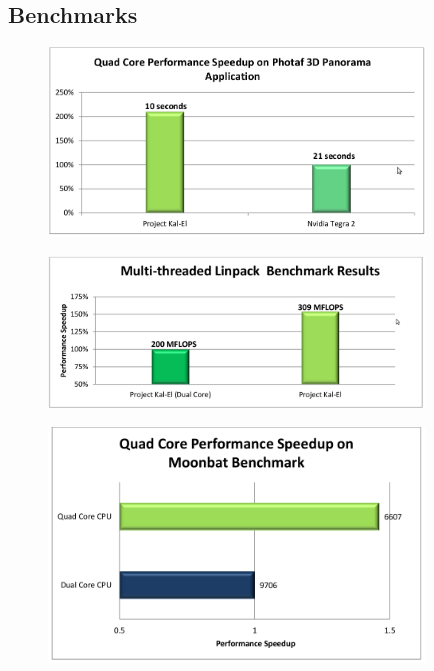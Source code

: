 \documentclass{beamer}
\begin{document}
\subsection{Benchmarks}  
\begin{frame}
  \begin{figure}[ht]
    \centering
    \includegraphics[width=10.0cm]{./pictures/QuadCorePhota.png}
   \end{figure}
\end{frame}

\begin{frame}
  \begin{figure}[ht]
    \centering
    \includegraphics[width=10.0cm]{./pictures/MultiThread.png}
  \end{figure}
\end{frame}

\begin{frame}
  \begin{figure}[ht]
    \centering
    \includegraphics[width=10.0cm]{./pictures/QuadCoreBenchmark.png}
  \end{figure}
\end{frame}
\end{document}
